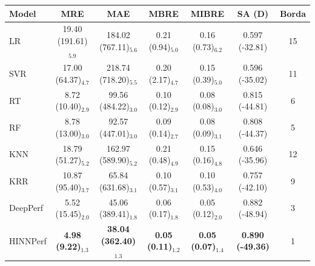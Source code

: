 \begin{tabular}{lcccccc}
\toprule
Model & MRE & MAE & MBRE & MIBRE & SA (D) & Borda \\
\midrule
LR & 19.40 (191.61)$_{5.9}$ & 184.02 (767.11)$_{5.6}$ & 0.21 (0.94)$_{5.0}$ & 0.16 (0.73)$_{6.2}$ & 0.597 (-32.81) & 15 \\
SVR & 17.00 (64.37)$_{4.7}$ & 218.74 (718.20)$_{5.5}$ & 0.20 (2.17)$_{4.7}$ & 0.15 (0.39)$_{5.0}$ & 0.596 (-35.02) & 11 \\
RT & 8.72 (10.40)$_{2.9}$ & 99.56 (484.22)$_{3.0}$ & 0.10 (0.12)$_{2.9}$ & 0.08 (0.08)$_{3.0}$ & 0.815 (-44.81) & 6 \\
RF & 8.78 (13.00)$_{3.0}$ & 92.57 (447.01)$_{3.0}$ & 0.09 (0.14)$_{2.7}$ & 0.08 (0.09)$_{3.1}$ & 0.808 (-44.37) & 5 \\
KNN & 18.79 (51.27)$_{5.2}$ & 162.97 (589.90)$_{5.2}$ & 0.21 (0.48)$_{4.9}$ & 0.15 (0.16)$_{4.8}$ & 0.646 (-35.96) & 12 \\
KRR & 10.87 (95.40)$_{3.7}$ & 65.84 (631.68)$_{3.1}$ & 0.10 (0.57)$_{3.1}$ & 0.10 (0.53)$_{4.0}$ & 0.757 (-42.10) & 9 \\
DeepPerf & 5.52 (15.45)$_{2.0}$ & 45.06 (389.41)$_{1.8}$ & 0.06 (0.17)$_{1.8}$ & 0.05 (0.12)$_{2.0}$ & 0.882 (-48.94) & 3 \\
HINNPerf & \textbf{4.98 (9.22)$_{1.3}$} & \textbf{38.04 (362.40)$_{1.3}$} & \textbf{0.05 (0.11)$_{1.2}$} & \textbf{0.05 (0.07)$_{1.4}$} & \textbf{0.890 (-49.36)} & 1 \\
\bottomrule
\end{tabular}
